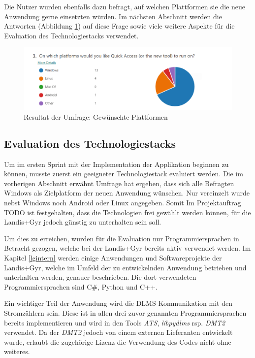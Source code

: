 Die Nutzer wurden ebenfalls dazu befragt, auf welchen Plattformen sie die neue Anwendung gerne einsetzten würden.
Im nächsten Abschnitt werden die Antworten (Abbildung \ref{fig:SurveryPlatforms}) auf diese Frage sowie viele weitere Aspekte für die Evaluation des Technologiestacks verwendet.

\begin{figure}[H]
   \centering
   \includegraphics[width=1.0\textwidth]{gfx/S0_Survey_Platform.png}
   \caption{
       Resultat der Umfrage: Gewünschte Plattformen
   }
   \label{fig:SurveryPlatforms}
\end{figure}

\subsection{Evaluation des Technologiestacks}
Um im ersten Sprint mit der Implementation der Applikation beginnen zu können, musste zuerst ein geeigneter Technologiestack evaluiert werden.
Die im vorherigen Abschnitt erwähnt Umfrage hat ergeben, dass sich alle Befragten Windows als Zielplatform der neuen Anwendung wünschen.
Nur vereinzelt wurde nebst Windows noch Android oder Linux angegeben.
Somit
Im Projektauftrag TODO ist festgehalten, dass die Technologien frei gewählt werden können, für die Landis+Gyr jedoch günstig zu unterhalten sein soll.

Um dies zu erreichen, wurden für die Evaluation nur Programmiersprachen in Betracht gezogen, welche bei der Landis+Gyr bereits aktiv verwendet werden.
Im Kapitel \ref{lgintern} werden einige Anwendungen und Softwareprojekte der Landis+Gyr, welche im Umfeld der zu entwickelnden Anwendung betrieben und unterhalten werden, genauer beschrieben.
Die dort verwendeten Programmiersprachen sind C\#, Python und C++.


Ein wichtiger Teil der Anwendung wird die \ac{DLMS} Kommunikation mit den Stromzählern sein.
Diese ist in allen drei zuvor genannten Programmiersprachen bereits implementieren und wird in den Tools \textit{ATS}, \textit{libpydlms} rsp. \textit{DMT2} verwendet.
Da der \textit{DMT2} jedoch von einem externen Lieferanten entwickelt wurde, erlaubt die zugehörige Lizenz die Verwendung des Codes nicht ohne weiteres.


